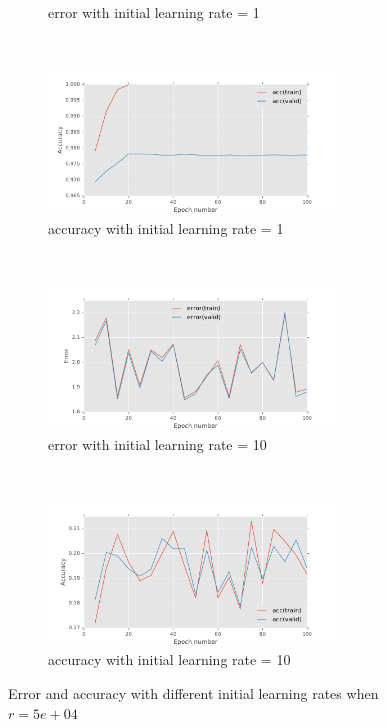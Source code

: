 \documentclass[11pt]{article}
\begin{document}
\begin{figure}[t!]
\begin{subfigure}[t]{0.45\textwidth}
        \caption{error with initial learning rate = 1}
    \end{subfigure}
	~
    \begin{subfigure}[t]{0.45\textwidth}
        \centering
        \includegraphics[height=1.5in]{acc_with_init_LR_1_0.pdf}
        \caption{accuracy with initial learning rate = 1}
    \end{subfigure}
	~
    \begin{subfigure}[t]{0.45\textwidth}
        \centering
        \includegraphics[height=1.5in]{error_with_init_LR_10.pdf}
        \caption{error with initial learning rate = 10}
    \end{subfigure}   
    ~
    \begin{subfigure}[t]{0.45\textwidth}
        \centering
        \includegraphics[height=1.5in]{acc_with_init_LR_10.pdf}
        \caption{accuracy with initial learning rate = 10}
    \end{subfigure}    
    \caption{Error and accuracy with different initial learning rates when $r=5e+04$}    
    \label{fig:init_LR}
\end{figure}
\end{document}
